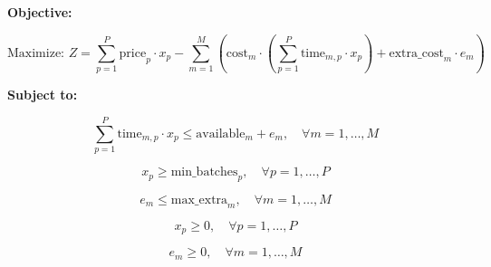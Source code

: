 \documentclass{article}
\begin{document}
\textbf{Objective:}

\[
\text{Maximize: } Z = \sum_{p=1}^{P} \text{price}_p \cdot x_p - \sum_{m=1}^{M} \left( \text{cost}_m \cdot \left( \sum_{p=1}^{P} \text{time}_{m,p} \cdot x_p \right) + \text{extra\_cost}_m \cdot e_m \right)
\]

\textbf{Subject to:}

\[
\sum_{p=1}^{P} \text{time}_{m,p} \cdot x_p \leq \text{available}_m + e_m, \quad \forall m = 1, \ldots, M
\]

\[
x_p \geq \text{min\_batches}_p, \quad \forall p = 1, \ldots, P
\]

\[
e_m \leq \text{max\_extra}_m, \quad \forall m = 1, \ldots, M
\]

\[
x_p \geq 0, \quad \forall p = 1, \ldots, P
\]

\[
e_m \geq 0, \quad \forall m = 1, \ldots, M
\]
\end{document}
